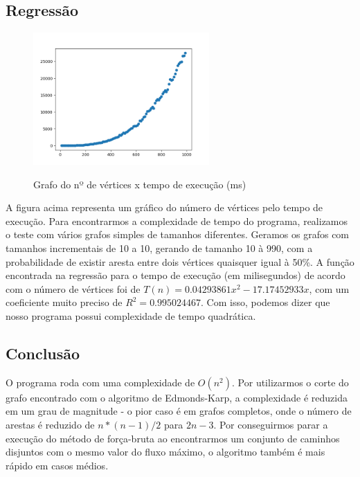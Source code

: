 \subsection{\esp Regressão}

\begin{figure}[ht]
	\centering	
	\caption[\hspace{0.1cm}Grafo nº vértices x tempo de execução.]{Grafo do nº de vértices x tempo de execução (ms)}
	\vspace{-0.4cm}
	\includegraphics[width=0.6\textwidth]{figuras/complexidade.png}
	 \vspace{-0.2cm}
	\label{fig:figura4}
\end{figure}

A figura acima representa um gráfico do número de vértices pelo tempo de execução. Para encontrarmos a complexidade de tempo do programa, realizamos o teste com vários grafos simples de tamanhos diferentes. Geramos os grafos com tamanhos incrementais de 10 a 10, gerando de tamanho 10 à 990, com a probabilidade de existir aresta entre dois vértices quaisquer igual à 50\%.
A função encontrada na regressão para o tempo de execução (em milisegundos) de acordo com o número de vértices foi de $T(n) = 0.04293861x^2 - 17.17452933x$, com um coeficiente muito preciso de $R^2 = 0.995024467$. Com isso, podemos dizer que nosso programa possui complexidade de tempo quadrática.

\subsection{\esp Conclusão}
O programa roda com uma complexidade de $O(n^{2})$. Por utilizarmos o corte do grafo encontrado com o algoritmo de Edmonds-Karp, a complexidade é reduzida em um grau de magnitude - o pior caso é em grafos completos, onde o número de arestas é reduzido de $n*(n-1)/2$ para $2n - 3$. Por conseguirmos parar a execução do método de força-bruta ao encontrarmos um conjunto de caminhos disjuntos com o mesmo valor do fluxo máximo, o algoritmo também é mais rápido em casos médios. 


